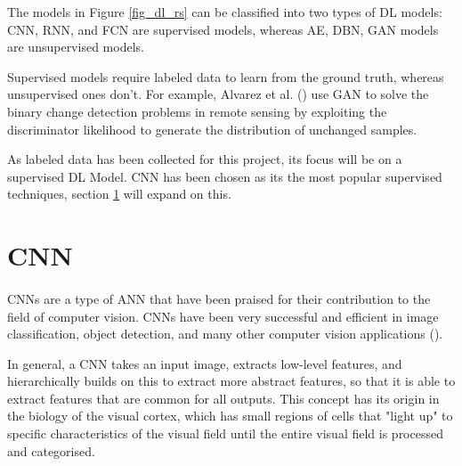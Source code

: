 The models in Figure \ref{fig_dl_rs} can be classified into two types of \gls{DL} models:
\gls{CNN}, \gls{RNN}, and \gls{FCN} are supervised models, whereas \gls{AE}, \gls{DBN}, \gls{GAN} models are unsupervised models. 

Supervised models require labeled data to learn from the ground truth, whereas unsupervised ones don't.  For example, Alvarez et al. (\cite{alvarez2020s2cgan}) use \gls{GAN} to solve the binary change detection problems in remote sensing by exploiting the discriminator likelihood to generate the distribution of unchanged samples.

As labeled data has been collected for this project, its focus will be on a supervised \gls{DL} Model. \gls{CNN} has been chosen as its the most popular supervised techniques, section \ref{cnn_subsect} will expand on this.



\section{\gls{CNN}} \label{cnn_subsect}
\paragraph{}
\gls{CNN}s are a type of \gls{ANN} that have been praised for their contribution to the field of computer vision. \gls{CNN}s have been very successful and efficient in image classification, object detection, and many other computer vision applications (\cite{GoodBengCour16}).

In general, a \gls{CNN} takes an input image, extracts low-level features, and hierarchically builds on this to extract more abstract features, so that it is able to extract features that are common for all outputs. This concept has its origin in the biology of the visual cortex, which has small regions of cells that "light up" to specific characteristics of the visual field until the entire visual field is processed and categorised.

